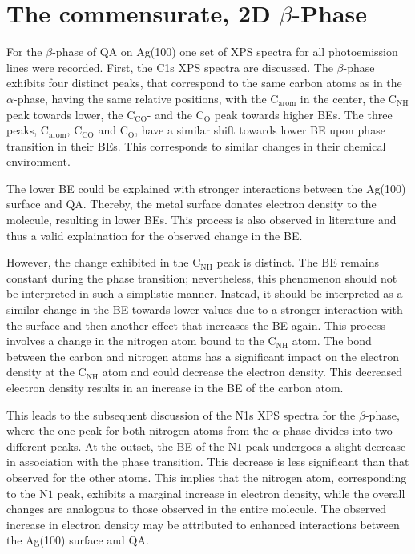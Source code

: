 \section{The commensurate, 2D \texorpdfstring{$\beta$}{beta}-Phase}

For the $\beta$-phase of \ac{QA} on Ag(100) one set of \ac{XPS} spectra for all photoemission lines were recorded. First, the C1s \ac{XPS} spectra are discussed.
The $\beta$-phase exhibits four distinct peaks, that correspond to the same carbon atoms as in the $\alpha$-phase, having the same relative positions, with the $\mathrm{C_{arom}}$ in the center, the $\mathrm{C_{NH}}$ peak towards lower, the $\mathrm{C_{CO}}$- and the $\mathrm{C_{O}}$ peak towards higher \acp{BE}. The three peaks, $\mathrm{C_{arom}}$, $\mathrm{C_{CO}}$ and $\mathrm{C_{O}}$, have a similar shift towards lower \ac{BE} upon phase transition in their \acp{BE}. This corresponds to similar changes in their chemical environment.

The lower \ac{BE} could be explained with stronger interactions between the Ag(100) surface and \ac{QA}. Thereby, the metal surface donates electron density to the molecule, resulting in lower \acp{BE}. This process is also observed in literature and thus a valid explaination for the observed change in the \ac{BE}.\autocite{Moulder1993}

However, the change exhibited in the $\mathrm{C_{NH}}$ peak is distinct. The \ac{BE} remains constant during the phase transition; nevertheless, this phenomenon should not be interpreted in such a simplistic manner. Instead, it should be interpreted as a similar change in the \ac{BE} towards lower values due to a stronger interaction with the surface and then another effect that increases the \ac{BE} again. This process involves a change in the nitrogen atom bound to the $\mathrm{C_{NH}}$ atom. The bond between the carbon and nitrogen atoms has a significant impact on the electron density at the $\mathrm{C_{NH}}$ atom and could decrease the electron density. This decreased electron density results in an increase in the \ac{BE} of the carbon atom.

This leads to the subsequent discussion of the N1s \ac{XPS} spectra for the $\beta$-phase, where the one peak for both nitrogen atoms from the $\alpha$-phase divides into two different peaks. At the outset, the \ac{BE} of the $\mathrm{N1}$ peak undergoes a slight decrease in association with the phase transition. This decrease is less significant than that observed for the other atoms. This implies that the nitrogen atom, corresponding to the $\mathrm{N1}$ peak, exhibits a marginal increase in electron density, while the overall changes are analogous to those observed in the entire molecule. The observed increase in electron density may be attributed to enhanced interactions between the Ag(100) surface and \ac{QA}.

